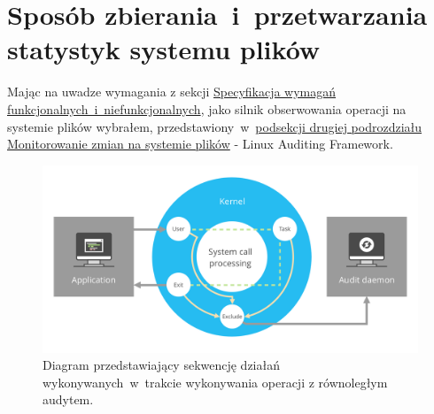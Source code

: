 \section{Sposób zbierania~i~przetwarzania statystyk systemu plików}
Mając na uwadze wymagania z sekcji \hyperref[sec:wymagania]{Specyfikacja wymagań funkcjonalnych~i~niefunkcjonalnych}, jako silnik obserwowania operacji na systemie plików wybrałem, przedstawiony~w~\hyperref[sec:auditd]{podsekcji drugiej podrozdziału Monitorowanie zmian na systemie plików} - Linux Auditing Framework.
\begin{figure}[H]
    \centering
    \includegraphics[width=0.9\linewidth]{rysunki/auditing.png}
    \caption{Diagram przedstawiający sekwencję działań wykonywanych~w~trakcie wykonywania operacji z równoległym audytem\protect \footnotemark.} 
    \label{fig:enter-label}
\end{figure}

